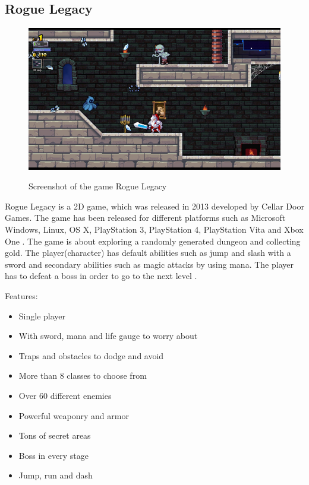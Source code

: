 \documentclass[12p]{article}
\begin{document}

\subsection{Rogue Legacy}

\begin{figure}[ht]
    \center
    \includegraphics[width=1\textwidth]{StateOfTheArtScreenshots/rogue_legacy}
    \label{StateOfTheArt_Screenshots_RogueLegacy}
    \caption{Screenshot of the game Rogue Legacy \cite{RogueLegacyScreenshot}}
\end{figure}

Rogue Legacy is a 2D game, which was released in 2013 developed by Cellar Door Games. The game has been released for different platforms such as Microsoft Windows, Linux, OS X, PlayStation 3, PlayStation 4, PlayStation Vita and Xbox One \cite{RogueLegacyWiki}. The game is about exploring a randomly generated dungeon and collecting gold. The player(character) has default abilities such as jump and slash with a sword and secondary abilities such as magic attacks by using mana. The player has to defeat a boss in order to go to the next level \cite{RogueLegacyReview}.

Features: \cite{RogueLegacySteam}

\begin{itemize}
    \item Single player
    \item With sword, mana and life gauge to worry about
    \item Traps and obstacles to dodge and avoid
    \item More than 8 classes to choose from
    \item Over 60 different enemies
    \item Powerful weaponry and armor
    \item Tons of secret areas
    \item Boss in every stage
    \item Jump, run and dash
\end{itemize}
\end{document}
